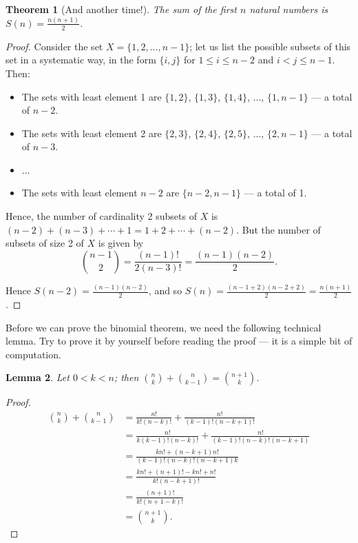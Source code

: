 \documentclass[a4paper]{amsart}
\newtheorem{thm}{Theorem}[section]
\newtheorem{lem}[thm]{Lemma}
\theoremstyle{definition}
\theoremstyle{remark}
\begin{document}
\begin{thm}[And another time!]\label{ex:w2}
  The sum of the first $ n $ natural numbers is $ S(n) = \frac{n(n+1)}{2} $.
\end{thm}
\begin{proof}
  Consider the set $ X = \{1, 2, ..., n-1\} $; let us list the possible subsets of this set in a systematic way, in the form $ \{i,j\} $
  for $ 1 \leq i \leq n - 2 $ and $ i < j \leq n - 1 $. Then:
  \begin{itemize}
    \item The sets with least element 1 are $ \{1, 2\} $, $ \{1, 3\} $, $ \{1, 4\} $, ..., $ \{1, n-1\} $ --- a total of $ n - 2 $.
    \item The sets with least element 2 are $ \{2, 3\} $, $ \{2, 4\} $, $ \{2, 5\} $, ..., $ \{2, n-1\} $ --- a total of $ n - 3 $.
    \item ...
    \item The sets with least element $ n - 2 $ are $ \{n - 2, n - 1\} $ --- a total of 1.
  \end{itemize}

  Hence, the number of cardinality 2 subsets of $ X $ is $ (n - 2) + (n - 3) + \cdots + 1 = 1 + 2 + \cdots + (n - 2) $. But the number
  of subsets of size 2 of $ X $ is given by
  \begin{displaymath}
    \binom{n - 1}{2} = \frac{(n - 1)!}{2(n - 3)!} = \frac{(n-1)(n-2)}{2}.
  \end{displaymath}

  Hence $ S(n - 2) = \frac{(n-1)(n-2)}{2} $, and so $ S(n) = \frac{(n - 1 + 2)(n - 2 + 2)}{2} = \frac{n(n+1)}{2} $.
\end{proof}

Before we can prove the binomial theorem, we need the following technical lemma. Try to prove it
by yourself before reading the proof --- it is a simple bit of computation.
\begin{lem}
  Let $ 0 < k < n $; then $ \binom{n}{k} + \binom{n}{k - 1} = \binom{n + 1}{k} $.
\end{lem}
\begin{proof}
  \begin{align*}
    \binom{n}{k} + \binom{n}{k - 1} &= \frac{n!}{k! (n - k)!} + \frac{n!}{(k - 1)! (n - k + 1)!}\\
                                    &= \frac{n!}{k(k - 1)! (n - k)!} + \frac{n!}{(k - 1)! (n - k)! (n - k + 1)}\\
                                    &= \frac{kn! + (n - k + 1) n!}{(k - 1)! (n - k)! (n - k + 1)k}\\
                                    &= \frac{kn! + (n + 1)! - kn! + n!}{k!(n - k + 1)!}\\
                                    &= \frac{(n + 1)!}{k!(n + 1 - k)!}\\
                                    &= \binom{n + 1}{k}.
  \end{align*}
\end{proof}
\end{document}
